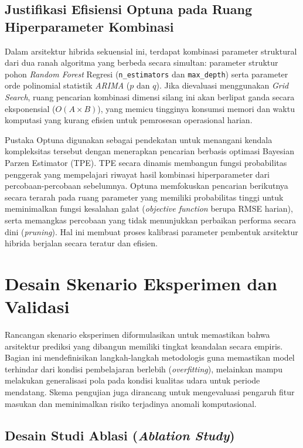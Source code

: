 \subsection{Justifikasi Efisiensi Optuna pada Ruang Hiperparameter Kombinasi}

Dalam arsitektur hibrida sekuensial ini, terdapat kombinasi parameter struktural dari dua ranah algoritma yang berbeda secara simultan: parameter struktur pohon \textit{Random Forest} Regresi (\texttt{n\_estimators} dan \texttt{max\_depth}) serta parameter orde polinomial statistik \textit{ARIMA} ($p$ dan $q$). Jika dievaluasi menggunakan \textit{Grid Search}, ruang pencarian kombinasi dimensi silang ini akan berlipat ganda secara eksponensial ($O(A \times B)$), yang memicu tingginya konsumsi memori dan waktu komputasi yang kurang efisien untuk pemrosesan operasional harian.

Pustaka Optuna digunakan sebagai pendekatan untuk menangani kendala kompleksitas tersebut dengan menerapkan pencarian berbasis optimasi Bayesian Parzen Estimator (TPE). TPE secara dinamis membangun fungsi probabilitas penggerak yang mempelajari riwayat hasil kombinasi hiperparameter dari percobaan-percobaan sebelumnya. Optuna memfokuskan pencarian berikutnya secara terarah pada ruang parameter yang memiliki probabilitas tinggi untuk meminimalkan fungsi kesalahan galat (\textit{objective function} berupa RMSE harian), serta memangkas percobaan yang tidak menunjukkan perbaikan performa secara dini (\textit{pruning}). Hal ini membuat proses kalibrasi parameter pembentuk arsitektur hibrida berjalan secara teratur dan efisien.

\section{Desain Skenario Eksperimen dan Validasi}

Rancangan skenario eksperimen diformulasikan untuk memastikan bahwa arsitektur prediksi yang dibangun memiliki tingkat keandalan secara empiris. Bagian ini mendefinisikan langkah-langkah metodologis guna memastikan model terhindar dari kondisi pembelajaran berlebih (\textit{overfitting}), melainkan mampu melakukan generalisasi pola pada kondisi kualitas udara untuk periode mendatang. Skema pengujian juga dirancang untuk mengevaluasi pengaruh fitur masukan dan meminimalkan risiko terjadinya anomali komputasional.

\subsection{Desain Studi Ablasi (\textit{Ablation Study})}


